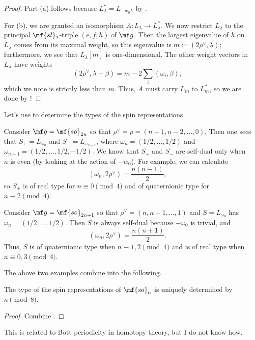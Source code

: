 \documentclass[../notes.tex]{subfiles}
\begin{document}
\begin{proof}
	Part (a) follows because $L_\lambda^*=L_{-w_0\lambda}$ by .

	For (b), we are granted an isomorphism $A\colon L_\lambda\to L_\lambda^*$. We now restrict $L_\lambda$ to the principal $\mf{sl}_2$-triple $(e,f,h)$ of $\mf g$. Then the largest eigenvalue of $h$ on $L_\lambda$ comes from its maximal weight, so this eigenvalue is $m\coloneqq(2\rho^\lor,\lambda)$; furthermore, we see that $L_\lambda[m]$ is one-dimensional. The other weight vectors in $L_\lambda$ have weights
	\[(2\rho^\lor,\lambda-\beta)=m-2\sum_i(\omega_i,\beta),\]
	which we note is strictly less than $m$. Thus, $A$ must carry $L_m$ to $L_m^*$, so we are done by !
\end{proof}
Let's use  to determine the types of the spin representations.
\begin{example} \label{ex:even-so-type}
	Consider $\mf g=\mf{so}_{2n}$ so that $\rho^\lor=\rho=(n-1,n-2,\ldots,0)$. Then one sees that $S_+=L_{\omega_n}$ and $S_-=L_{\omega_{n-1}}$, where $\omega_n=(1/2,\ldots,1/2)$ and $\omega_{n-1}=(1/2,\ldots,1/2,-1/2)$. We know that $S_+$ and $S_-$ are self-dual only when $n$ is even (by looking at the action of $-w_0$). For example, we can calculate
	\[(\omega_n,2\rho^\lor)=\frac{n(n-1)}2,\]
	so $S_+$ is of real type for $n\equiv0\pmod4$ and of quaternionic type for $n\equiv2\pmod4$.
\end{example}
\begin{example} \label{ex:odd-so-type}
	Consider $\mf g=\mf{so}_{2n+1}$ so that $\rho^\lor=(n,n-1,\ldots,1)$ and $S=L_{\omega_n}$ has $\omega_n=(1/2,\ldots,1/2)$. Then $S$ is always self-dual because $-\omega_0$ is trivial, and
	\[(\omega_n,2\rho^\lor)=\frac{n(n+1)}2.\]
	Thus, $S$ is of quaternionic type when $n\equiv1,2\pmod4$ and is of real type when $n\equiv0,3\pmod4$.
\end{example}
The above two examples combine into the following.
\begin{theorem}
	The type of the spin representations of $\mf{so}_n$ is uniquely determined by $n\pmod 8$.
\end{theorem}
\begin{proof}
	Combine .
\end{proof}
\begin{remark}
	This is related to Bott periodicity in homotopy theory, but I do not know how.
\end{remark}
\end{document}
